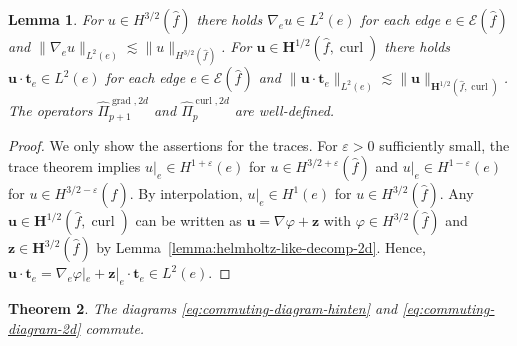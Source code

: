 \documentclass{article}
\newtheorem{theorem}{Theorem}[section]
\newtheorem{lemma}[theorem]{Lemma}
\newcommand{\hatPicurlcomtwod}{\widehat \Pi^{\operatorname*{curl},2d}_p}
\newcommand{\hatPigradcomtwod}{\widehat\Pi^{\operatorname*{grad},2d}_{p+1}}
\begin{document}
\begin{lemma}
\label{lemma:traces-2d}
For $u\in H^{3/2}(\widehat f)$ there holds $\nabla_e u \in L^2(e)$ for 
each edge $e \in {\mathcal E}(\widehat f)$ and 
$\|\nabla_e u\|_{L^2(e)} \lesssim \|u\|_{H^{3/2}(\widehat f)}$. 
For ${\mathbf u} \in {\mathbf H}^{1/2}(\widehat f,\operatorname*{curl})$ there holds 
${\mathbf u} \cdot {\mathbf t}_e \in L^2(e)$ for 
each edge $e \in {\mathcal E}(\widehat f)$ 
and 
$\|{\mathbf u} \cdot {\mathbf t}_e\|_{L^2(e)} \lesssim \|{\mathbf u}\|_{{\mathbf H}^{1/2}(\widehat f,\operatorname*{curl})}$. 
The operators $\hatPigradcomtwod$ and $\hatPicurlcomtwod$ are well-defined. 
\end{lemma}
\begin{proof} We only show the assertions for the traces. For $\varepsilon > 0$ sufficiently small, 
the trace theorem implies $u|_e \in H^{1+\varepsilon}(e)$ for $u \in H^{3/2+\varepsilon}(\widehat f)$
and $u|_e \in H^{1-\varepsilon}(e)$ for $u \in H^{3/2-\varepsilon}(\widehat f)$. By interpolation, 
$u|_e \in H^1(e)$ for $u \in H^{3/2}(\widehat f)$. 
Any ${\mathbf u} \in {\mathbf H}^{1/2}(\widehat f,\operatorname*{curl})$ can be written 
as ${\mathbf u} = \nabla \varphi + {\mathbf z}$ with $\varphi \in H^{3/2}(\widehat f)$ and 
${\mathbf z} \in {\mathbf H}^{3/2}(\widehat f)$ by Lemma~\ref{lemma:helmholtz-like-decomp-2d}. Hence, 
${\mathbf u} \cdot {\mathbf t}_e = \nabla_e \varphi|_e + {\mathbf z}|_e \cdot {\mathbf t}_e \in L^2(e)$. 
\end{proof}
\begin{theorem}
\label{thm:diagram-commutes} The diagrams
\eqref{eq:commuting-diagram-hinten} and \eqref{eq:commuting-diagram-2d} commute.
\end{theorem}
\end{document}
